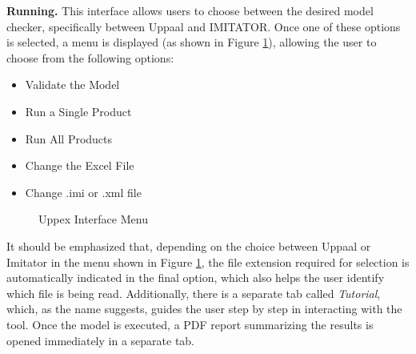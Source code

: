 \medskip

\noindent
\textbf{Running.} This interface allows users to choose between the desired model checker, specifically between Uppaal and IMITATOR. Once one of these options is selected, a menu is displayed (as shown in Figure \ref{fig:UI}), allowing the user to choose from the following options:

\begin{itemize}
    \item Validate the Model
    \item Run a Single Product
    \item Run All Products
    \item Change the Excel File
    \item Change .imi or .xml file
\end{itemize}

\begin{figure}[H]
    \centering
    \begin{minipage}{0.78\textwidth}
        \centering
        \caption{Uppex Interface Menu}
        \label{fig:UI}
    \end{minipage}
\end{figure}

It should be emphasized that, depending on the choice between Uppaal or Imitator in the menu shown in Figure \ref{fig:UI}, the file extension required for selection is automatically indicated in the final option, which also helps the user identify which file is being read. Additionally, there is a separate tab called \textit{Tutorial}, which, as the name suggests, guides the user step by step in interacting with the tool. Once the model is executed, a PDF report summarizing the results is opened immediately in a separate tab.



